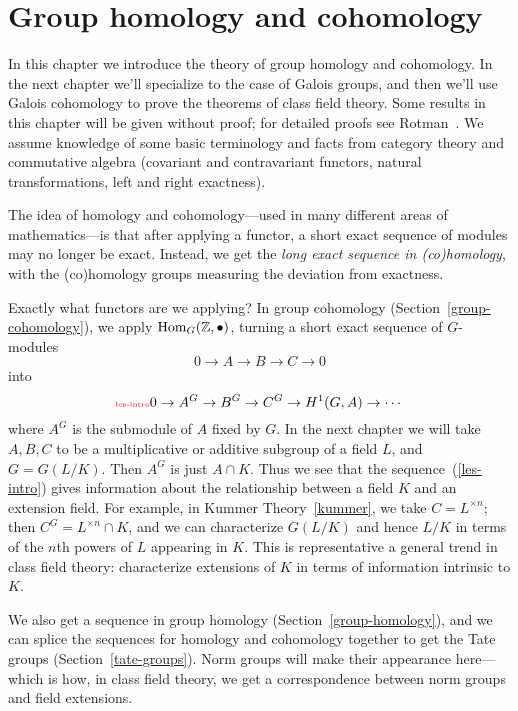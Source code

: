 \chapter{Group homology and cohomology}
In this chapter we introduce the theory of group homology and cohomology. In the next chapter we'll specialize to the case of Galois groups, and then we'll use Galois cohomology to prove the theorems of class field theory. Some results in this chapter will be given without proof; for detailed proofs see Rotman~\cite{Ro09}. We assume knowledge of some basic terminology and facts from category theory and commutative algebra (covariant and contravariant functors, natural transformations, left and right exactness).

The idea of homology and cohomology---used in many different areas of mathematics---is that after applying a functor, a short exact sequence of modules may no longer be exact. Instead, we get the {\it long exact sequence in (co)homology}, with the (co)homology groups measuring the deviation from exactness.

Exactly what functors are we applying? In group cohomology (Section~\ref{group-cohomology}), we apply $\operatorname{Hom}_G(\mathbb{Z},\bullet)$, turning a short exact sequence of $G$-modules
\[
0\to A \to B\to C\to 0
\]
into
\begin{equation}\llabel{les-intro}
0\to A^G\to B^G \to C^G\to H^1(G,A)\to  \cdots
\end{equation}
where $A^G$ is the submodule of $A$ fixed by $G$. In the next chapter we will take $A,B,C$ to be a multiplicative or additive subgroup of a field $L$, and $G=G(L/K)$. Then $A^G$ is just $A\cap K$. Thus we see that the sequence~(\ref{les-intro}) gives information about the relationship between a field $K$ and an extension field. For example, in Kummer Theory~\ref{kummer}, we take $C=L^{\times n}$; then $C^G=L^{\times n}\cap K$, and we can characterize $G(L/K)$ and hence $L/K$ in terms of the $n$th powers of $L$ appearing in $K$. This is representative a general trend in class field theory: characterize extensions of $K$ in terms of information intrinsic to $K$.

We also get a sequence in group homology (Section~\ref{group-homology}), and we can splice the sequences for homology and cohomology together to get the Tate groups (Section~\ref{tate-groups}). Norm groups will make their appearance here---which is how, in class field theory, we get a correspondence between norm groups and field extensions.

